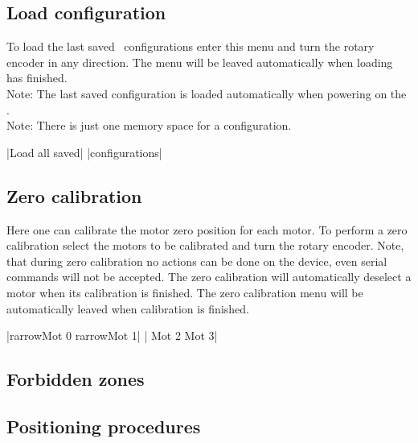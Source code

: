 \subsection{Load configuration}
\label{chp:menu_load}
To load the last saved \productName ~configurations enter this menu
and turn the rotary encoder in any direction. The menu will be leaved
automatically when loading has
finished.\\
Note: The last saved configuration is loaded automatically when
powering on the \productName.\\
Note: There is just one memory space for a configuration.
\begin{center}
  |Load all saved|
             |configurations|
\end{center}


\subsection{Zero calibration}
\label{menu_zero_cal}
Here one can calibrate the motor zero position for each motor. To
perform a zero calibration select the motors to be calibrated and
turn the rotary encoder. Note, that during zero calibration no actions
can be done on the device, even serial commands will not be accepted.
The zero calibration will automatically deselect a motor when its
calibration is finished. The zero calibration menu will be automatically
leaved when calibration is finished.
\begin{center}
  |{rarrow}Mot 0  {rarrow}Mot 1|
             | Mot 2   Mot 3|
\end{center}


\subsection{Forbidden zones}
\label{chp:forbidden_zone}

\subsection{Positioning procedures}
\label{chp:positioning_procedure}








\newpage
